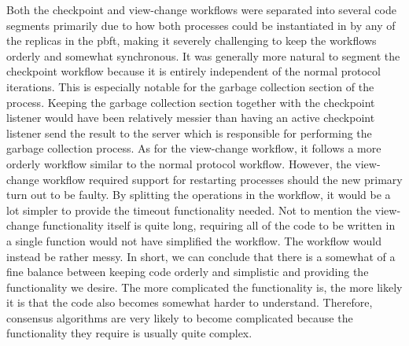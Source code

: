 Both the checkpoint and view-change workflows were separated into several code segments primarily due to how both processes could be instantiated in by any of the replicas in the \ac{pbft}, making it severely challenging to keep the workflows orderly and somewhat synchronous. It was generally more natural to segment the checkpoint workflow because it is entirely independent of the normal protocol iterations. This is especially notable for the garbage collection section of the process. Keeping the garbage collection section together with the checkpoint listener would have been relatively messier than having an active checkpoint listener send the result to the server which is responsible for performing the garbage collection process. As for the view-change workflow, it follows a more orderly workflow similar to the normal protocol workflow. However, the view-change workflow required support for restarting processes should the new primary turn out to be faulty. By splitting the operations in the workflow, it would be a lot simpler to provide the timeout functionality needed. Not to mention the view-change functionality itself is quite long, requiring all of the code to be written in a single function would not have simplified the workflow. The workflow would instead be rather messy. In short, we can conclude that there is a somewhat of a fine balance between keeping code orderly and simplistic and providing the functionality we desire. The more complicated the functionality is, the more likely it is that the code also becomes somewhat harder to understand. Therefore, consensus algorithms are very likely to become complicated because the functionality they require is usually quite complex.


